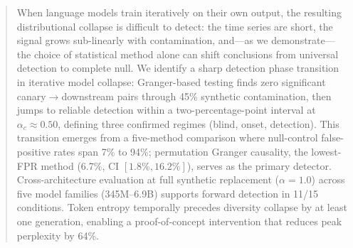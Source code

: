 \begin{abstract}
When language models train iteratively on their own output, the resulting distributional collapse is difficult to detect: the time series are short, the signal grows sub-linearly with contamination, and---as we demonstrate---the choice of statistical method alone can shift conclusions from universal detection to complete null.
We identify a sharp detection phase transition in iterative model collapse: Granger-based testing finds zero significant canary$\to$downstream pairs through 45\% synthetic contamination, then jumps to reliable detection within a two-percentage-point interval at $\alpha_c \approx 0.50$, defining three confirmed regimes (blind, onset, detection).
This transition emerges from a five-method comparison where null-control false-positive rates span 7\% to 94\%; permutation Granger causality, the lowest-FPR method (6.7\%, CI $[1.8\%, 16.2\%]$), serves as the primary detector.
Cross-architecture evaluation at full synthetic replacement ($\alpha{=}1.0$) across five model families (345M--6.9B) supports forward detection in 11/15 conditions.
Token entropy temporally precedes diversity collapse by at least one generation, enabling a proof-of-concept intervention that reduces peak perplexity by 64\%.
\end{abstract}
